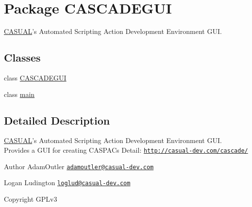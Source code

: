 \hypertarget{namespace_c_a_s_c_a_d_e_g_u_i}{\section{Package C\-A\-S\-C\-A\-D\-E\-G\-U\-I}
\label{namespace_c_a_s_c_a_d_e_g_u_i}
}


\hyperlink{namespace_c_a_s_u_a_l}{C\-A\-S\-U\-A\-L}'s Automated Scripting Action Development Environment G\-U\-I.  


\subsection*{Classes}
\begin{DoxyCompactItemize}
\item 
class \hyperlink{class_c_a_s_c_a_d_e_g_u_i_1_1_c_a_s_c_a_d_e_g_u_i}{C\-A\-S\-C\-A\-D\-E\-G\-U\-I}
\item 
class \hyperlink{class_c_a_s_c_a_d_e_g_u_i_1_1main}{main}
\end{DoxyCompactItemize}


\subsection{Detailed Description}
\hyperlink{namespace_c_a_s_u_a_l}{C\-A\-S\-U\-A\-L}'s Automated Scripting Action Development Environment G\-U\-I. Provides a G\-U\-I for creating C\-A\-S\-P\-A\-Cs Detail\-: \href{http://casual-dev.com/cascade/}{\tt http\-://casual-\/dev.\-com/cascade/} \begin{DoxyAuthor}{Author}
Adam\-Outler \href{mailto:adamoutler@casual-dev.com}{\tt adamoutler@casual-\/dev.\-com} 

Logan Ludington \href{mailto:loglud@casual-dev.com}{\tt loglud@casual-\/dev.\-com} 
\end{DoxyAuthor}
\begin{DoxyCopyright}{Copyright}
G\-P\-Lv3 
\end{DoxyCopyright}
